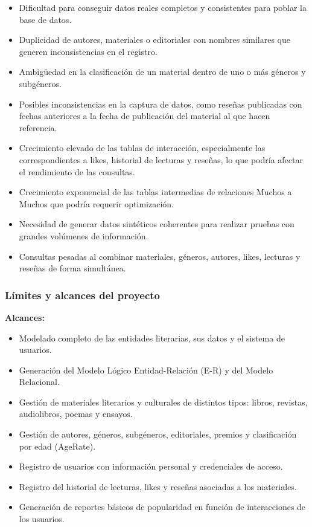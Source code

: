 \documentclass[12pt,a4paper]{article}
\begin{document}
\begin{itemize}
    \item Dificultad para conseguir datos reales completos y consistentes para poblar la base de datos.
    \item Duplicidad de autores, materiales o editoriales con nombres similares que generen inconsistencias en el registro.
    \item Ambigüedad en la clasificación de un material dentro de uno o más géneros y subgéneros.
    \item Posibles inconsistencias en la captura de datos, como reseñas publicadas con fechas anteriores a la fecha de publicación del material al que hacen referencia.
    \item Crecimiento elevado de las tablas de interacción, especialmente las correspondientes a likes, historial de lecturas y reseñas, lo que podría afectar el rendimiento de las consultas.
    \item Crecimiento exponencial de las tablas intermedias de relaciones Muchos a Muchos que podría requerir optimización.
    \item Necesidad de generar datos sintéticos coherentes para realizar pruebas con grandes volúmenes de información.
    \item Consultas pesadas al combinar materiales, géneros, autores, likes, lecturas y reseñas de forma simultánea.
\end{itemize}

\subsubsection{Límites y alcances del proyecto}

\textbf{Alcances:}
\begin{itemize}
    \item Modelado completo de las entidades literarias, sus datos y el sistema de usuarios.
    \item Generación del Modelo Lógico Entidad-Relación (E-R) y del Modelo Relacional.
    \item Gestión de materiales literarios y culturales de distintos tipos: libros, revistas, audiolibros, poemas y ensayos.
    \item Gestión de autores, géneros, subgéneros, editoriales, premios y clasificación por edad (AgeRate).
    \item Registro de usuarios con información personal y credenciales de acceso.
    \item Registro del historial de lecturas, likes y reseñas asociadas a los materiales.
    \item Generación de reportes básicos de popularidad en función de interacciones de los usuarios.
\end{itemize}
\end{document}
